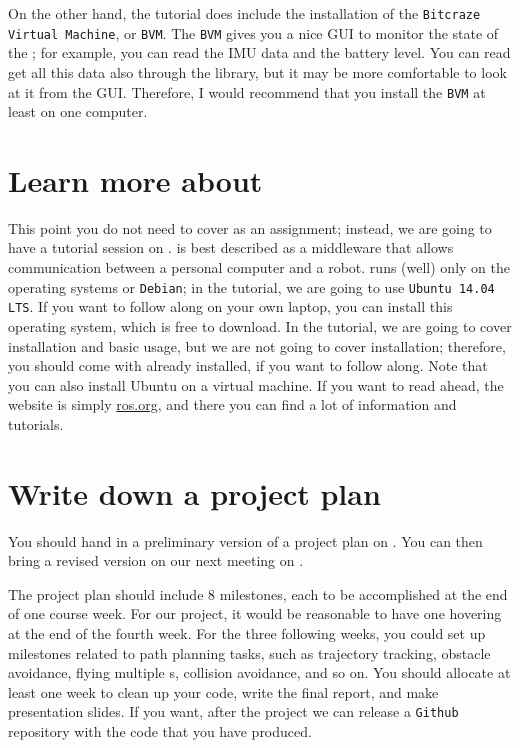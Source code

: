 On the other hand, the tutorial does include the installation of the \texttt{Bitcraze Virtual Machine}, or \texttt{BVM}.
The \texttt{BVM} gives you a nice GUI to monitor the state of the \CF{}; for example, you can read the IMU data and the battery level.
You can read get all this data also through the \ROS{} library, but it may be more comfortable to look at it from the GUI.
Therefore, I would recommend that you install the \texttt{BVM} at least on one computer.








\section*{Learn more about \ROS{}}

This point you do not need to cover as an assignment; instead, we are going to have a tutorial session on .
\ROS{} is best described as a middleware that allows communication between a personal computer and a robot.
\ROS{} runs (well) only on the operating systems \Ubuntu{} or \texttt{Debian}; in the tutorial, we are going to use \texttt{Ubuntu 14.04 LTS}.
If you want to follow along on your own laptop, you can install this operating system, which is free to download.
In the tutorial, we are going to cover \ROS{} installation and basic usage, but we are not going to cover \Ubuntu{} installation; therefore, you should come with \Ubuntu{} already installed, if you want to follow along.
Note that you can also install Ubuntu on a virtual machine.
If you want to read ahead, the \ROS{} website is simply \href{http://ros.org}{ros.org}, and there you can find a lot of information and tutorials.










\section*{Write down a project plan}

You should hand in a preliminary version of a project plan on .
You can then bring a revised version on our next meeting on .

The project plan should include 8 milestones, each to be accomplished at the end of one course week.
For our project, it would be reasonable to have one \CF{} hovering at the end of the fourth week.
For the three following weeks, you could set up milestones related to path planning tasks, such as trajectory tracking, obstacle avoidance, flying multiple \CF{}s, collision avoidance, and so on.
You should allocate at least one week to clean up your code, write the final report, and make presentation slides.
If you want, after the project we can release a \texttt{Github} repository with the code that you have produced.









